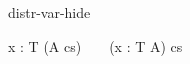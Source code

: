 \begin{circuslaw}{distr-var-hide}
\begin{circusaction*}
  \circvar x : T \circspot (A \circhide cs) ~ \equiv ~ (\circvar x : T \circspot A) \circhide cs
\end{circusaction*}
\end{circuslaw}
